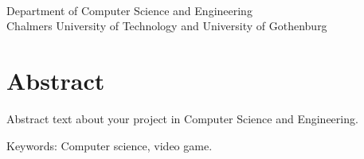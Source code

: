 \oneLineTitle\\
\oneLineSubtitle\\
\authorName\\
Department of Computer Science and Engineering\\
Chalmers University of Technology and University of Gothenburg

\thispagestyle{plain}			%
\section*{Abstract}
Abstract text about your project in  Computer Science and Engineering.

\vfill
Keywords: Computer science, video game.

\newpage				%
\thispagestyle{empty}
\mbox{}
